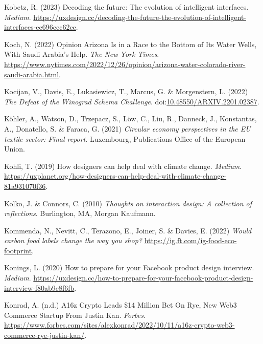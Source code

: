 \documentclass[
  letterpaper,
  DIV=11,
  numbers=noendperiod]{scrartcl}
\newlength{\cslhangindent}
\newenvironment{CSLReferences}[2] %
 {\begin{list}{}{%
  \setlength{\itemindent}{0pt}
  \setlength{\leftmargin}{0pt}
  \setlength{\parsep}{0pt}
  \ifodd #1
   \setlength{\leftmargin}{\cslhangindent}
   \setlength{\itemindent}{-1\cslhangindent}
  \fi
  \setlength{\itemsep}{#2\baselineskip}}}
 {\end{list}}
\begin{document}
\begin{CSLReferences}{0}{1}
Kobetz, R. (2023) Decoding the future: The evolution of intelligent
interfaces. \emph{Medium}.
\url{https://uxdesign.cc/decoding-the-future-the-evolution-of-intelligent-interfaces-ec696ccc62cc}.

Koch, N. (2022) Opinion {\textbar} {Arizona Is} in a {Race} to the
{Bottom} of {Its Water Wells}, {With Saudi Arabia}'s {Help}. \emph{The
New York Times}.
\url{https://www.nytimes.com/2022/12/26/opinion/arizona-water-colorado-river-saudi-arabia.html}.

Kocijan, V., Davis, E., Lukasiewicz, T., Marcus, G. \& Morgenstern, L.
(2022) \emph{The {Defeat} of the {Winograd Schema Challenge}}.
doi:\href{https://doi.org/10.48550/ARXIV.2201.02387}{10.48550/ARXIV.2201.02387}.

Köhler, A., Watson, D., Trzepacz, S., Löw, C., Liu, R., Danneck, J.,
Konstantas, A., Donatello, S. \& Faraca, G. (2021) \emph{Circular
economy perspectives in the {EU} textile sector: Final report}.
Luxembourg, Publications Office of the European Union.

Kohli, T. (2019) How designers can help deal with climate change.
\emph{Medium}.
\url{https://uxplanet.org/how-designers-can-help-deal-with-climate-change-81a931070f36}.

Kolko, J. \& Connors, C. (2010) \emph{Thoughts on interaction design: A
collection of reflections}. Burlington, MA, Morgan Kaufmann.

Kommenda, N., Nevitt, C., Terazono, E., Joiner, S. \& Davies, E. (2022)
\emph{Would carbon food labels change the way you shop?}
\url{https://ig.ft.com/ig-food-eco-footprint}.

Konings, L. (2020) How to prepare for your {Facebook} product design
interview. \emph{Medium}.
\url{https://uxdesign.cc/how-to-prepare-for-your-facebook-product-design-interview-f80ab9e8f6fb}.

Konrad, A. (n.d.) A16z {Crypto Leads} \$14 {Million Bet On Rye}, {New
Web3 Commerce Startup From Justin Kan}. \emph{Forbes}.
\url{https://www.forbes.com/sites/alexkonrad/2022/10/11/a16z-crypto-web3-commerce-rye-justin-kan/}.


\end{CSLReferences}
\end{document}
